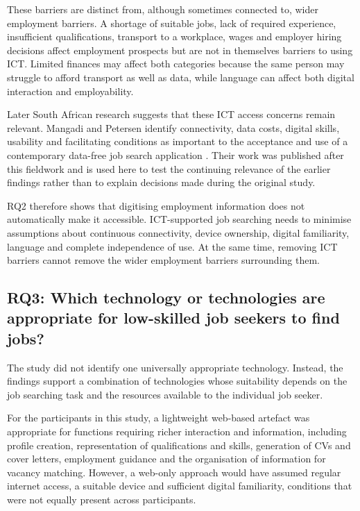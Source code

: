 These barriers are distinct from, although sometimes connected to, wider employment barriers. A shortage of suitable jobs, lack of required experience, insufficient qualifications, transport to a workplace, wages and employer hiring decisions affect employment prospects but are not in themselves barriers to using ICT. Limited finances may affect both categories because the same person may struggle to afford transport as well as data, while language can affect both digital interaction and employability.

Later South African research suggests that these ICT access concerns remain relevant. Mangadi and Petersen identify connectivity, data costs, digital skills, usability and facilitating conditions as important to the acceptance and use of a contemporary data-free job search application \cite{mangadi2024}. Their work was published after this fieldwork and is used here to test the continuing relevance of the earlier findings rather than to explain decisions made during the original study.

RQ2 therefore shows that digitising employment information does not automatically make it accessible. ICT-supported job searching needs to minimise assumptions about continuous connectivity, device ownership, digital familiarity, language and complete independence of use. At the same time, removing ICT barriers cannot remove the wider employment barriers surrounding them.


\subsection{RQ3: Which technology or technologies are appropriate for low-skilled job seekers to find jobs?}

The study did not identify one universally appropriate technology. Instead, the findings support a combination of technologies whose suitability depends on the job searching task and the resources available to the individual job seeker.

For the participants in this study, a lightweight web-based artefact was appropriate for functions requiring richer interaction and information, including profile creation, representation of qualifications and skills, generation of CVs and cover letters, employment guidance and the organisation of information for vacancy matching. However, a web-only approach would have assumed regular internet access, a suitable device and sufficient digital familiarity, conditions that were not equally present across participants.

